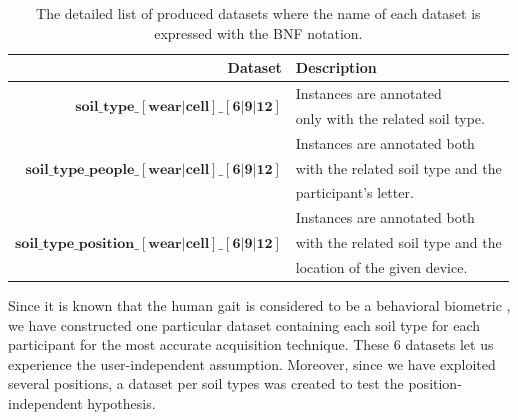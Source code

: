 \documentclass[10pt,conference]{IEEEtran}
\begin{document}
\begin{table}[!ht]
    \centering
    \caption{The detailed list of produced datasets where the name of each dataset is expressed with the BNF notation.}
    \label{tab:datasets}
    \resizebox{.8\columnwidth}{!} 
	{
   		\begin{tabular}{rl}
    		\toprule
        		\textbf{Dataset}
        		&\textbf{Description}\\
        	\midrule
    			\multirow{2}{*}{$\textbf{soil\_type\_}[\textbf{wear} | \textbf{cell}]\_[\textbf{6} | \textbf{9} | \textbf{12}]$}
    			&Instances are annotated\\&only with the related soil type. \\
    		\midrule
    			\multirow{3}{*}{$\textbf{soil\_type\_people\_}[\textbf{wear} | \textbf{cell}]\_[\textbf{6} | \textbf{9} | \textbf{12}]$}
    			&Instances are annotated both\\&with the related soil type and the \\&participant's letter.\\
    		\midrule  
    			\multirow{3}{*}{$\textbf{soil\_type\_position\_}[\textbf{wear} | \textbf{cell}]\_[\textbf{6} | \textbf{9} | \textbf{12}]$}
    			&Instances are annotated both\\&with the related soil type and the\\&location of the given device.\\
    		\bottomrule
    	\end{tabular}
    }
\end{table}


Since it is known that the human gait is considered to be a behavioral biometric \cite{Thullier2016c}, we have constructed one particular dataset containing each soil type for each participant for the most accurate acquisition technique. These 6 datasets let us experience the user-independent assumption. Moreover, since we have exploited several positions, a dataset per soil types was created to test the position-independent hypothesis. 

\end{document}
